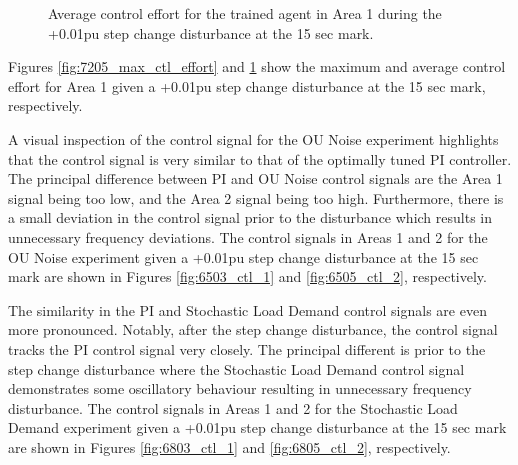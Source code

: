 \begin{figure}[h]
	\begin{minipage}[t]{0.50\textwidth}
		\centering
		\resizebox{7cm}{!}{}
		\caption{Maximum control effort for the trained agent in Area 1 during the +0.01pu step change disturbance at the 15 sec mark.}\label{fig:7205_max_ctl_effort}
	\end{minipage}
	\hspace{0.25cm}
	\begin{minipage}[t]{0.50\textwidth}
		\resizebox{7cm}{!}{}
		\caption{Average control effort for the trained agent in Area 1 during the +0.01pu step change disturbance at the 15 sec mark.}\label{fig:7205_avg_ctl_effort}
	\end{minipage}
\end{figure}

Figures \ref{fig:7205_max_ctl_effort} and \ref{fig:7205_avg_ctl_effort} show the maximum and average control effort for Area 1 given a +0.01pu step change disturbance at the 15 sec mark, respectively.

A visual inspection of the control signal for the OU Noise experiment highlights that the control signal is very similar to that of the optimally tuned PI controller. The principal difference between PI and OU Noise control signals are the Area 1 signal being too low, and the Area 2 signal being too high. Furthermore, there is a small deviation in the control signal prior to the disturbance which results in unnecessary frequency deviations. The control signals in Areas 1 and 2 for the OU Noise experiment given a +0.01pu step change disturbance at the 15 sec mark are shown in Figures \ref{fig:6503_ctl_1} and \ref{fig:6505_ctl_2}, respectively.

The similarity in the PI and Stochastic Load Demand control signals are even more pronounced. Notably, after the step change disturbance, the control signal tracks the PI control signal very closely. The principal different is prior to the step change disturbance where the Stochastic Load Demand control signal demonstrates some oscillatory behaviour resulting in unnecessary frequency disturbance. The control signals in Areas 1 and 2 for the Stochastic Load Demand experiment given a +0.01pu step change disturbance at the 15 sec mark are shown in Figures \ref{fig:6803_ctl_1} and \ref{fig:6805_ctl_2}, respectively.


